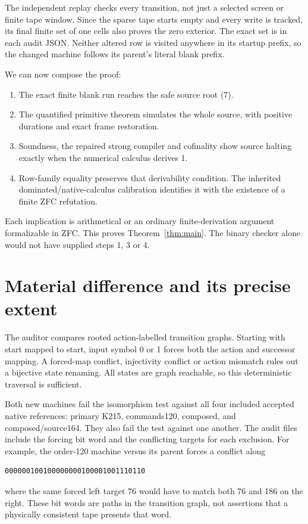 \documentclass[11pt,a4paper]{article}
\theoremstyle{remark}\newtheorem{remark}[theorem]{Remark}
\begin{document}
The independent replay checks every transition, not just a selected
screen or finite tape window. Since the sparse tape starts empty and
every write is tracked, its final finite set of one cells also proves
the zero exterior. The exact set is in each audit JSON. Neither
altered row is visited anywhere in its startup prefix, so the changed
machine follows its parent's literal blank prefix.

We can now compose the proof:
\begin{enumerate}
\item The exact finite blank run reaches the safe source root (7).
\item The quantified primitive theorem simulates the whole source,
with positive durations and exact frame restoration.
\item Soundness, the repaired strong compiler and cofinality show
source halting exactly when the numerical calculus derives 1.
\item Row-family equality preserves that derivability condition.
The inherited dominated/native-calculus calibration identifies it
with the existence of a finite ZFC refutation.
\end{enumerate}
Each implication is arithmetical or an ordinary finite-derivation
argument formalizable in ZFC. This proves Theorem~\ref{thm:main}.
The binary checker alone would not have supplied steps 1, 3 or 4.

\section{Material difference and its precise extent}\label{sec:distinction}

The auditor compares rooted action-labelled transition graphs. Starting
with start mapped to start, input symbol 0 or 1 forces both the action
and successor mapping. A forced-map conflict, injectivity conflict or
action mismatch rules out a bijective state renaming. All states are
graph reachable, so this deterministic traversal is sufficient.

Both new machines fail the isomorphism test against all four included
accepted native references: primary K215, commands120, composed, and
composed/source164. They also fail the test against one another.
The audit files include the forcing bit word and the conflicting
targets for each exclusion. For example, the order-120 machine versus
its parent forces a conflict along
\begin{lstlisting}
000000100100000000100001001110110
\end{lstlisting}
where the same forced left target 76 would have to match both 76 and
186 on the right. These bit words are paths in the transition graph,
not assertions that a physically consistent tape presents that word.
\end{document}
